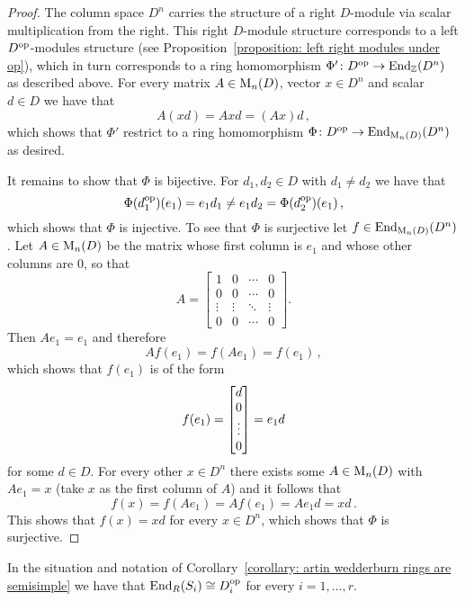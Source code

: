 \begin{proof}
  
  The column space $D^n$ carries the structure of a right $D$-module via scalar multiplication from the right.
  This right $D$-module structure corresponds to a left $D^{\operatorname{op}}$-modules structure (see Proposition~\ref{proposition: left right modules under op}), which in turn corresponds to a ring homomorphism $\Phi' \colon D^{\operatorname{op}} \to \operatorname{End}_{\mathbb{Z}}(D^n)$ as described above.
  For every matrix $A \in \operatorname{M}_n(D)$, vector $x \in D^n$ and scalar $d \in D$ we have that
  \[
      A(xd)
    = Axd
    = (Ax)d \,,
  \]
  which shows that $\Phi'$ restrict to a ring homomorphism $\Phi \colon D^{\operatorname{op}} \to \operatorname{End}_{\operatorname{M}_n(D)}(D^n)$ as desired.
  
  It remains to show that $\Phi$ is bijective.
  For $d_1, d_2 \in D$ with $d_1 \neq d_2$ we have that
  \[
          \Phi(d_1^{\operatorname{op}})(e_1)
    =     e_1 d_1
    \neq  e_1 d_2
    =     \Phi(d_2^{\operatorname{op}})(e_1) \,,
  \]
  which shows that $\Phi$ is injective.
  To see that $\Phi$ is surjective let $f \in \operatorname{End}_{\operatorname{M}_n(D)}(D^n)$.
  Let $A \in \operatorname{M}_n(D)$ be the matrix whose first column is $e_1$ and whose other columns are $0$, so that
  \[
      A
    = \begin{bmatrix}
        1       & 0       & \cdots  & 0       \\
        0       & 0       & \cdots  & 0       \\
        \vdots  & \vdots  & \ddots  & \vdots  \\
        0       & 0       & \cdots  & 0
      \end{bmatrix}.
  \]
  Then $A e_1 = e_1$ and therefore
  \[
      A f(e_1)
    = f(A e_1)
    = f(e_1) \,,
  \]
  which shows that $f(e_1)$ is of the form
  \[
      f(e_1)
    = \begin{bmatrix}d \\ 0 \\ \vdots \\ 0\end{bmatrix}
    = e_1 d
  \]
  for some $d \in D$.
  For every other $x \in D^n$ there exists some $A \in \operatorname{M}_n(D)$ with $Ae_1 = x$ (take $x$ as the first column of $A$) and it follows that
  \[
      f(x)
    = f(A e_1)
    = A f(e_1)
    = A e_1 d
    = x d \,.
  \]
  This shows that $f(x) = xd$ for every $x \in D^n$, which shows that $\Phi$ is surjective.
\end{proof}


\begin{corollary}
  \label{corollary: endomorphism ring of Si}
  In the situation and notation of Corollary~\ref{corollary: artin wedderburn rings are semisimple} we have that $\operatorname{End}_R(S_i) \cong D_i^{\operatorname{op}}$ for every $i = 1, \dotsc, r$.
\end{corollary}


